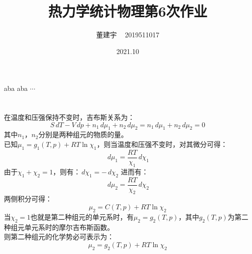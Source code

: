 \documentclass[a4paper,12pt]{article}
\title{热力学统计物理第6次作业}
\date{2021.10}
\author{董建宇 ~ 2019511017}
\begin{document}
\maketitle

\titleformat{\section}[hang]{\small}{\thesection}{0.8em}{}{}
\titleformat{\subsection}[hang]{\small}{\thesubsection}{0.8em}{}{}

\section{}
aba aba $\cdots$


\section{}
在温度和压强保持不变时，吉布斯关系为：
\begin{equation}\nonumber
	S\,dT - V\,dp + n_1 \,d\mu_1 + n_2 \,d\mu_2 = n_1 \,d\mu_1 + n_2 \,d\mu_2 = 0
\end{equation}
其中$n_1$，$n_2$分别是两种组元的物质的量。 \\
已知$\mu_1 = g_1(T, p) + RT\ln\chi_1$，则当温度和压强不变时，对其微分可得：
\begin{equation}\nonumber
	\,d\mu_1 = \frac{RT}{\chi_1} \,d\chi_1
\end{equation}
由于$\chi_1 + \chi_2 = 1$，则有：$\,d\chi_1 = -\,d\chi_2$
进而有：
\begin{equation}\nonumber
	\,d\mu_2 = \frac{RT}{\chi_2} \,d\chi_2
\end{equation}
两侧积分可得：
\begin{equation}\nonumber
	\mu_2 = C(T, p) + RT\ln\chi_2
\end{equation}
当$\chi_2 = 1$也就是第二种组元的单元系时，有$\mu_2 = g_2(T, p)$，其中$g_2(T, p)$为第二种组元单元系时的摩尔吉布斯函数。\\
则第二种组元的化学势必可表示为：
\begin{equation}\nonumber
	\mu_2 = g_2(T, p) + RT \ln\chi_2
\end{equation}
\end{document}
